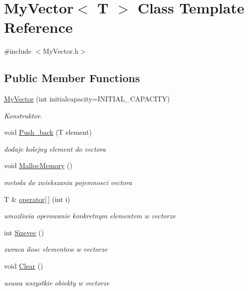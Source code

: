 \hypertarget{class_my_vector}{}\section{My\+Vector$<$ T $>$ Class Template Reference}
\label{class_my_vector}


{\ttfamily \#include $<$My\+Vector.\+h$>$}

\subsection*{Public Member Functions}
\begin{DoxyCompactItemize}
\item 
\hyperlink{class_my_vector_a8fd71ac4f7522c6860dc859e9b46f4c9}{My\+Vector} (int initialcapacity=I\+N\+I\+T\+I\+A\+L\+\_\+\+C\+A\+P\+A\+C\+I\+TY)
\begin{DoxyCompactList}\small\item\em Konstruktor. \end{DoxyCompactList}\item 
void \hyperlink{class_my_vector_a9c0be74e27cccdde01b7e8de25062e3a}{Push\+\_\+back} (T element)
\begin{DoxyCompactList}\small\item\em dodaje kolejny element do vectora \end{DoxyCompactList}\item 
void \hyperlink{class_my_vector_a6d3349a2cbf1ffd5965bfae2a7acd57c}{Malloc\+Memory} ()
\begin{DoxyCompactList}\small\item\em metoda do zwiekszania pojemnosci vectora \end{DoxyCompactList}\item 
T \& \hyperlink{class_my_vector_a3c79a753f0955808c6e97e574a2f3496}{operator\mbox{[}$\,$\mbox{]}} (int i)
\begin{DoxyCompactList}\small\item\em umozliwia operowanie konkretnym elementem w vectorze \end{DoxyCompactList}\item 
int \hyperlink{class_my_vector_a626cb4a9b2bae47d8752a3b82c413a4d}{Sizevec} ()
\begin{DoxyCompactList}\small\item\em zwraca ilosc elementow w vectorze \end{DoxyCompactList}\item 
void \hyperlink{class_my_vector_adc155c04c9e259a034f268788b39babd}{Clear} ()
\begin{DoxyCompactList}\small\item\em usuwa wszystkie obiekty w vectorze \end{DoxyCompactList}\end{DoxyCompactItemize}


